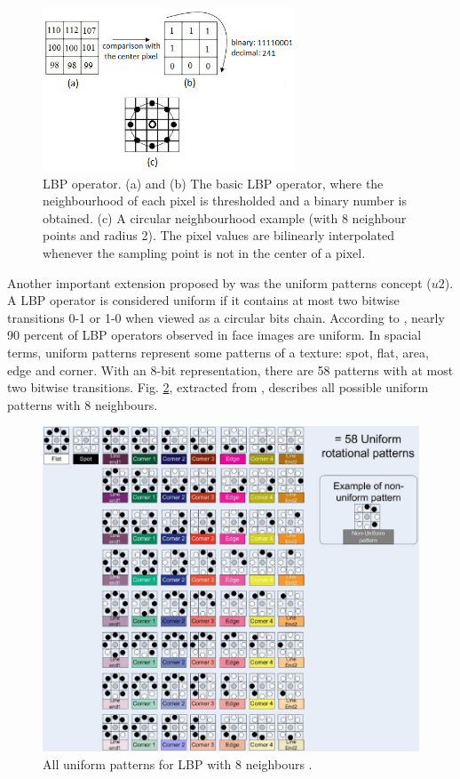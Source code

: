 \begin{figure}
\begin{center}
\includegraphics [width=7.5cm] {images/lbp_operator}
\caption[LBP operator]{LBP operator. (a) and (b) The basic LBP operator, where the neighbourhood of each pixel is thresholded and a binary number is obtained. (c) A circular neighbourhood example (with 8 neighbour points and radius 2). The pixel values are bilinearly interpolated whenever the sampling point is not in the center of a pixel.} \label{fig_lbpOperator}
\end{center}
\end{figure}

Another important extension proposed by \cite{ojala2002multiresolution} was the uniform patterns concept ($u2$). A LBP operator is considered uniform if it contains at most two bitwise transitions 0-1 or 1-0 when viewed as a circular bits chain. According to \cite{ojala2002multiresolution}, nearly 90 percent of LBP operators observed in face images are uniform. In spacial terms, uniform patterns represent some patterns of a texture: spot, flat, area, edge and corner. With an 8-bit representation, there are 58 patterns with at most two bitwise transitions. Fig. \ref{fig_uniformPattern}, extracted from \cite{chan2007multi}, describes all possible uniform patterns with 8 neighbours.

\begin{figure}
\begin{center}
\includegraphics [width=12cm] {images/fig_uniformPattern} 
\end{center}
   \caption[All uniform patterns for LBP with 8 neighbours]{All uniform patterns for LBP with 8 neighbours \cite{chan2007multi}.}   
\label{fig_uniformPattern}
\end{figure}

